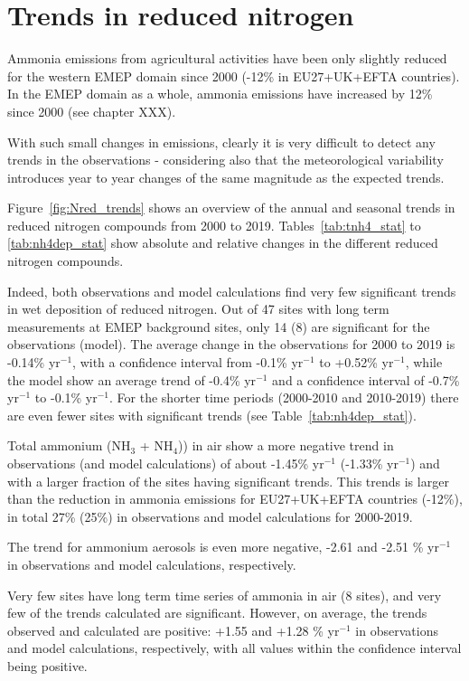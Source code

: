 \section{\label{sec:Trends_reduced nitrogen }Trends in reduced nitrogen}
Ammonia emissions from agricultural activities have been only slightly reduced for the western EMEP domain since 2000 (-12\% in EU27+UK+EFTA countries). In the EMEP domain as a whole, ammonia emissions have increased by 12\% since 2000 (see chapter XXX).

With such small changes in emissions, clearly it is very difficult to detect any trends in the observations - considering also that the meteorological variability introduces year to year changes of the same magnitude as the expected trends.

Figure~\ref{fig:Nred_trends} shows an overview of the annual and seasonal trends in reduced nitrogen compounds from 2000 to 2019. Tables~\ref{tab:tnh4_stat} to \ref{tab:nh4dep_stat} show absolute and relative changes in the different reduced nitrogen compounds.

Indeed, both observations and model calculations find very few significant trends in wet deposition of reduced nitrogen. Out of 47 sites with long term measurements at EMEP background sites, only 14 (8) are significant for the observations (model). The average change in the observations for 2000 to 2019 is -0.14\% yr$^{-1}$, with a confidence interval from -0.1\% yr$^{-1}$ to +0.52\% yr$^{-1}$, while the model show an average trend of -0.4\% yr$^{-1}$ and a confidence interval of -0.7\% yr$^{-1}$ to -0.1\% yr$^{-1}$. For the shorter time periods (2000-2010 and 2010-2019) there are even fewer sites with significant trends (see Table~\ref{tab:nh4dep_stat}).

Total ammonium (NH$_3$ + NH$_4$)) in air show a more negative trend in observations (and model calculations) of about -1.45\% yr$^{-1}$ (-1.33\% yr$^{-1}$) and with a larger fraction of the sites having significant trends. This trends is larger than the reduction in ammonia emissions for EU27+UK+EFTA countries (-12\%), in total 27\% (25\%) in observations and model calculations for 2000-2019.

The trend for ammonium aerosols is even more negative, -2.61 and -2.51 \% yr$^{-1}$ in observations and model calculations, respectively.

Very few sites have long term time series of ammonia in air (8 sites), and very few of the trends calculated are significant. However, on average, the trends observed and calculated are positive: +1.55 and +1.28 \% yr$^{-1}$ in observations and model calculations, respectively, with all values within the confidence interval being positive.

